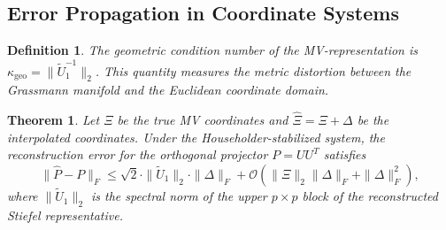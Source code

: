 \documentclass[11pt]{article}
\newtheorem{theorem}{Theorem}
\newtheorem{definition}{Definition}
\begin{document}
\subsection{Error Propagation in Coordinate Systems}

\begin{definition} 
The geometric condition number of the MV-representation is $\kappa_{\text{geo}} = \|\widetilde U_1^{-1}\|_2$. This quantity measures the metric distortion between the Grassmann manifold and the Euclidean coordinate domain.
\end{definition}

\begin{theorem} \label{thm:err_prop}
Let $\Xi$ be the true MV coordinates and $\hat{\Xi} = \Xi + \Delta$ be the interpolated coordinates. Under the Householder-stabilized system, the reconstruction error for the orthogonal projector $P = UU^T$ satisfies
\begin{equation} \label{eq:err_bound_final}
\|\hat{P} - P\|_F \leq \sqrt{2} \cdot \|\widetilde U_1\|_2 \cdot \|\Delta\|_F + \mathcal{O}(\|\Xi\|_2 \|\Delta\|_F + \|\Delta\|_F^2),
\end{equation}
where $\|\widetilde U_1\|_2$ is the spectral norm of the upper $p \times p$ block of the reconstructed Stiefel representative.
\end{theorem}
\end{document}
